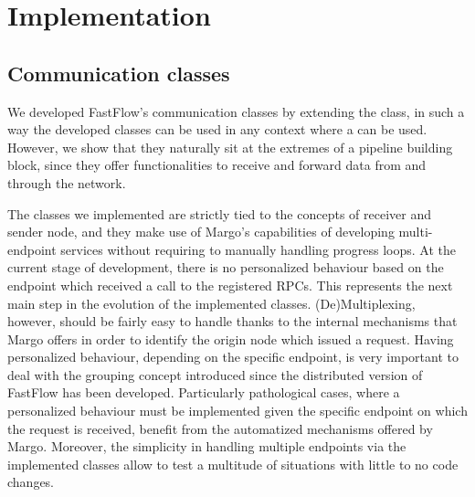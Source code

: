 \section{Implementation}
\label{sec:implementation}
\subsection{Communication classes}
We developed FastFlow's communication classes by extending the  class, in such a way the developed classes can be used in any context where a  can be used. However, we show that they naturally sit at the extremes of a pipeline building block, since they offer functionalities to receive and forward data from and through the network.\newline

The classes we implemented are strictly tied to the concepts of receiver and sender node, and they make use of Margo's capabilities of developing multi-endpoint services without requiring to manually handling progress loops. At the current stage of development, there is no personalized behaviour based on the endpoint which received a call to the registered RPCs. This represents the next main step in the evolution of the implemented classes. (De)Multiplexing, however, should be fairly easy to handle thanks to the internal mechanisms that Margo offers in order to identify the origin node which issued a request. Having personalized behaviour, depending on the specific endpoint, is very important to deal with the grouping concept introduced since the distributed version of FastFlow has been developed. Particularly pathological cases, where a personalized behaviour must be implemented given the specific endpoint on which the request is received, benefit from the automatized mechanisms offered by Margo. Moreover, the simplicity in handling multiple endpoints via the implemented classes allow to test a multitude of situations with little to no code changes.\newline


